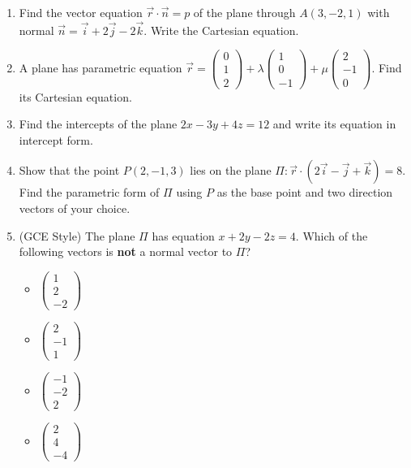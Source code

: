 \documentclass[11pt]{article}
\begin{document}
\begin{exercice}
\begin{enumerate}
    \item Find the vector equation $\vec{r}\cdot\vec{n}=p$ of the plane through $A(3, -2, 1)$ with normal $\vec{n} = \vec{i} + 2\vec{j} - 2\vec{k}$. Write the Cartesian equation.
    \item A plane has parametric equation $\vec{r} = \begin{pmatrix} 0 \\ 1 \\ 2 \end{pmatrix} + \lambda \begin{pmatrix} 1 \\ 0 \\ -1 \end{pmatrix} + \mu \begin{pmatrix} 2 \\ -1 \\ 0 \end{pmatrix}$. Find its Cartesian equation.
    \item Find the intercepts of the plane $2x - 3y + 4z = 12$ and write its equation in intercept form.
    \item Show that the point $P(2, -1, 3)$ lies on the plane $\Pi: \vec{r}\cdot(2\vec{i} - \vec{j} + \vec{k}) = 8$. Find the parametric form of $\Pi$ using $P$ as the base point and two direction vectors of your choice.
    \item (GCE Style) The plane $\Pi$ has equation $x + 2y - 2z = 4$. Which of the following vectors is \textbf{not} a normal vector to $\Pi$?
    \begin{itemize}
        \item[A] $\begin{pmatrix} 1 \\ 2 \\ -2 \end{pmatrix}$
        \item[B] $\begin{pmatrix} 2 \\ -1 \\ 1 \end{pmatrix}$
        \item[C] $\begin{pmatrix} -1 \\ -2 \\ 2 \end{pmatrix}$
        \item[D] $\begin{pmatrix} 2 \\ 4 \\ -4 \end{pmatrix}$
    \end{itemize}
\end{enumerate}
\end{exercice}
\end{document}
